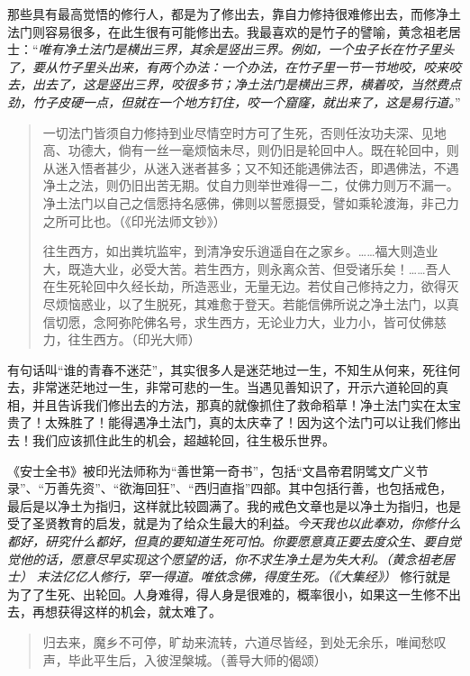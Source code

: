 那些具有最高觉悟的修行人，都是为了修出去，靠自力修持很难修出去，而修净土法门则容易很多，在此生很有可能修出去。我最喜欢的是竹子的譬喻，黄念祖老居士：“\textit{唯有净土法门是横出三界，其余是竖出三界。例如，一个虫子长在竹子里头了，要从竹子里头出来，有两个办法：一个办法，在竹子里一节一节地咬，咬来咬去，出去了，这是竖出三界，咬很多节；净土法门是横出三界，横着咬，当然费点劲，竹子皮硬一点，但就在一个地方钉住，咬一个窟窿，就出来了，这是易行道。}”

\begin{quotation}
    一切法门皆须自力修持到业尽情空时方可了生死，否则任汝功夫深、见地高、功德大，倘有一丝一毫烦恼未尽，则仍旧是轮回中人。既在轮回中，则从迷入悟者甚少，从迷入迷者甚多；又不知还能遇佛法否，即遇佛法，不遇净土之法，则仍旧出苦无期。仗自力则举世难得一二，仗佛力则万不漏一。净土法门以自己之信愿持名感佛，佛则以誓愿摄受，譬如乘轮渡海，非己力之所可比也。（《印光法师文钞》）

    往生西方，如出粪坑监牢，到清净安乐逍遥自在之家乡。……福大则造业大，既造大业，必受大苦。若生西方，则永离众苦、但受诸乐矣！……吾人在生死轮回中久经长劫，所造恶业，无量无边。若仗自己修持之力，欲得灭尽烦恼惑业，以了生脱死，其难愈于登天。若能信佛所说之净土法门，以真信切愿，念阿弥陀佛名号，求生西方，无论业力大，业力小，皆可仗佛慈力，往生西方。（印光大师）
\end{quotation}

有句话叫“谁的青春不迷茫”，其实很多人是迷茫地过一生，不知生从何来，死往何去，非常迷茫地过一生，非常可悲的一生。当遇见善知识了，开示六道轮回的真相，并且告诉我们修出去的方法，那真的就像抓住了救命稻草！净土法门实在太宝贵了！太殊胜了！能得遇净土法门，真的太庆幸了！因为这个法门可以让我们修出去！我们应该抓住此生的机会，超越轮回，往生极乐世界。

《安士全书》被印光法师称为“善世第一奇书”，包括“文昌帝君阴骘文广义节录”、“万善先资”、“欲海回狂”、“西归直指”四部。其中包括行善，也包括戒色，最后是以净土为指归，这样就比较圆满了。我的戒色文章也是以净土为指归，也是受了圣贤教育的启发，就是为了给众生最大的利益。\textit{今天我也以此奉劝，你修什么都好，研究什么都好，但真的要知道生死可怕。你要愿意真正要去度众生、要自觉觉他的话，愿意尽早实现这个愿望的话，你不求生净土是为失大利。（黄念祖老居士）} \textit{末法亿亿人修行，罕一得道。唯依念佛，得度生死。（《大集经》）} 修行就是为了了生死、出轮回。人身难得，得人身是很难的，概率很小，如果这一生修不出去，再想获得这样的机会，就太难了。

\begin{quote}
    归去来，魔乡不可停，旷劫来流转，六道尽皆经，到处无余乐，唯闻愁叹声，毕此平生后，入彼涅槃城。（善导大师的偈颂）
\end{quote}

